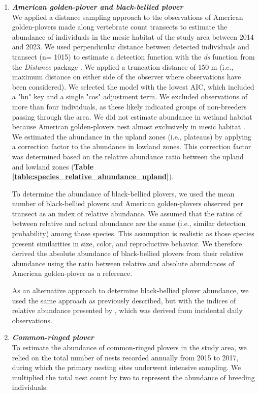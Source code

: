 \documentclass[a4paper,twoside,12pt]{article}
\begin{document}
\begin{enumerate}[label=\alph*.]
        	\item[] \textit{\textbf{American golden-plover and black-bellied plover}}\\
        	We applied a distance sampling approach to the observations of American golden-plovers made along vertebrate count transects to estimate the abundance of individuals in the mesic habitat of the study area between 2014 and 2023. We used perpendicular distance between detected individuals and transect (n= 1015) to estimate a detection function with the \textit{ds} function from the \textit{Distance} package \citep{miller2019}. We applied a truncation distance of 150 m (i.e., maximum distance on either side of the observer where observations have been considered). We selected the model with the lowest AIC, which included a "hn" key and a single "cos" adjustment term. We excluded observations of more than four individuals, as these likely indicated groups of non-breeders passing through the area. We did not estimate abundance in wetland habitat because American golden-plovers nest almost exclusively in mesic habitat \citep{parmelee1967}. We estimated the abundance in the upland zones (i.e., plateaus) by applying a correction factor to the abundance in lowland zones. This correction factor was determined based on the relative abundance ratio between the upland and lowland zones (\textbf{Table \ref{table:species_relative_abundance_upland}}).
        	
To determine the abundance of black-bellied plovers, we used the mean number of black-bellied plovers and American golden-plovers observed per transect as an index of relative abundance. We assumed that the ratios of between relative and actual abundance are the same (i.e., similar detection probability) among those species. This assumption is realistic as those species present similarities in size, color, and reproductive behavior. We therefore derived the absolute abundance of black-bellied plovers from their relative abundance using the ratio between relative and absolute abundances of American golden-plover as a reference.

As an alternative approach to determine black-bellied plover abundance, we used the same approach as previously described, but with the indices of relative abundance presented by \citet{gauthier2024a}, which was derived from incidental daily observations.

        	\item[] \textit{\textbf{Common-ringed plover}}\\
        	To estimate the abundance of common-ringed plovers in the study area, we relied on the total number of nests recorded annually from 2015 to 2017, during which the primary nesting sites underwent intensive sampling. We multiplied the total nest count by two to represent the abundance of breeding individuals.
        	

\end{enumerate}
\end{document}
